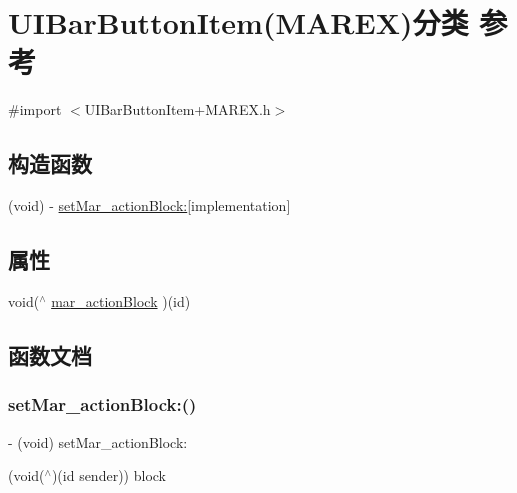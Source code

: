 \hypertarget{category_u_i_bar_button_item_07_m_a_r_e_x_08}{}\section{U\+I\+Bar\+Button\+Item(M\+A\+R\+EX)分类 参考}
\label{category_u_i_bar_button_item_07_m_a_r_e_x_08}


{\ttfamily \#import $<$U\+I\+Bar\+Button\+Item+\+M\+A\+R\+E\+X.\+h$>$}

\subsection*{构造函数}
\begin{DoxyCompactItemize}
\item 
(void) -\/ \hyperlink{category_u_i_bar_button_item_07_m_a_r_e_x_08_a88ed89ef9fd901cc4ce272b6a1fe6633}{set\+Mar\+\_\+action\+Block\+:}{\ttfamily  \mbox{[}implementation\mbox{]}}
\end{DoxyCompactItemize}
\subsection*{属性}
\begin{DoxyCompactItemize}
\item 
void($^\wedge$ \hyperlink{category_u_i_bar_button_item_07_m_a_r_e_x_08_a8fed155aa71a12f11fee04ab1e2f9554}{mar\+\_\+action\+Block} )(id)
\end{DoxyCompactItemize}


\subsection{函数文档}
\mbox{\label{category_u_i_bar_button_item_07_m_a_r_e_x_08_a88ed89ef9fd901cc4ce272b6a1fe6633}} 
\subsubsection{\texorpdfstring{set\+Mar\+\_\+action\+Block\+:()}{setMar\_actionBlock:()}}
{\footnotesize\ttfamily -\/ (void) set\+Mar\+\_\+action\+Block\+: \begin{DoxyParamCaption}\item[{(void($^\wedge$)(id sender))}]{block }\end{DoxyParamCaption}\hspace{0.3cm}{\ttfamily [implementation]}}



